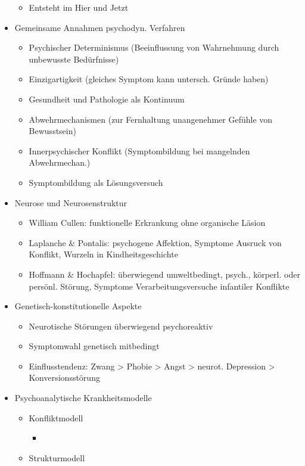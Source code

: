 \documentclass[11pt, paper=a4, twocolumn]{scrartcl}
\begin{document}
\begin{itemize}
\begin{itemize}
					\item Entsteht im Hier und Jetzt
				\end{itemize}
			\item Gemeinsame Annahmen psychodyn. Verfahren
				\begin{itemize}
					\item Psychischer Determinismus (Beeinflussung von Wahrnehmung durch unbewusste Bedürfnisse)
					\item Einzigartigkeit (gleiches Symptom kann untersch. Gründe haben)
					\item Gesundheit und Pathologie als Kontinuum
					\item Abwehrmechanismen (zur Fernhaltung unangenehmer Gefühle von Bewusstsein)
					\item Innerpsychischer Konflikt (Symptombildung bei mangelnden Abwehrmechan.)
					\item Symptombildung als Lösungsversuch
				\end{itemize}
			\item Neurose und Neurosenstruktur
				\begin{itemize}
					\item William Cullen: funktionelle Erkrankung ohne organische Läsion
					\item Laplanche \& Pontalis: psychogene Affektion, Symptome Ausruck von Konflikt, Wurzeln in Kindheitsgeschichte
					\item Hoffmann \& Hochapfel: überwiegend umweltbedingt, psych., körperl. oder persönl. Störung, Symptome 
						Verarbeitungsversuche infantiler Konflikte
				\end{itemize}
			\item Genetisch-konstitutionelle Aspekte
				\begin{itemize}
					\item Neurotische Störungen überwiegend psychoreaktiv
					\item Symptomwahl genetisch mitbedingt
					\item Einflusstendenz: Zwang > Phobie > Angst > neurot. Depression > Konversionsstörung
				\end{itemize}
			\item Psychoanalytische Krankheitsmodelle
				\begin{itemize}
					\item Konfliktmodell
						\begin{itemize}
							\item 
						\end{itemize}
					\item Strukturmodell

\end{itemize}
\end{itemize}
\end{document}
